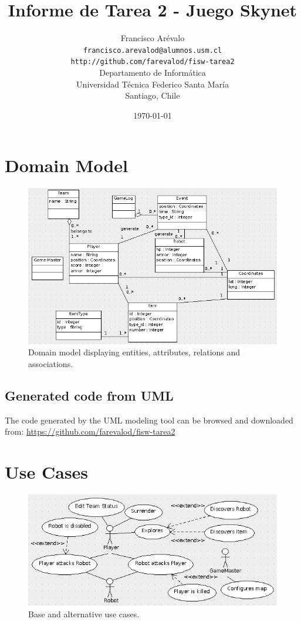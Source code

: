 \documentclass{article}
\begin{document}
\title{Informe de Tarea 2 - Juego Skynet}
\author{Francisco Ar\'evalo\\
  \texttt{francisco.arevalod@alumnos.usm.cl}\\
  \texttt{http://github.com/farevalod/fisw-tarea2}\\
  \vspace{10mm}
  Departamento de Inform\'atica\\
  Universidad T\'ecnica Federico Santa Mar\'ia\\
  Santiago, Chile}
\date{\today}
\maketitle
\tableofcontents
\section{Domain Model}
\begin{figure}[htb]
\centering
\includegraphics[scale=0.5]{domain-model}
\caption{Domain model displaying entities, attributes, relations and associations.}
\end{figure}
\subsection{Generated code from UML}
The code generated by the UML modeling tool can be browsed and downloaded from: 
\url{https://github.com/farevalod/fisw-tarea2}
\section{Use Cases}
\begin{figure}[htb]
\centering
\includegraphics[scale=0.5]{basic-use-case}
\caption{Base and alternative use cases.}
\end{figure}
\end{document}
